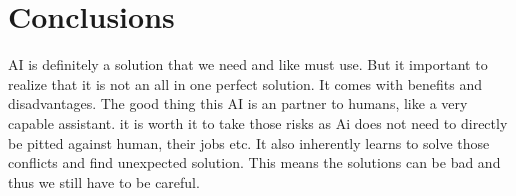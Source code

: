 \chapter{Conclusions}
AI is definitely a solution that we need and like must use. But it important to realize that it is not an all in one perfect solution. It comes with benefits and disadvantages. The good thing this AI is an partner to humans, like a very capable assistant. it is worth it to take those risks as Ai does not need to directly be pitted against human, their jobs etc. It also inherently learns to solve those conflicts and find unexpected solution. This means the solutions can be bad and thus we still have to be careful.